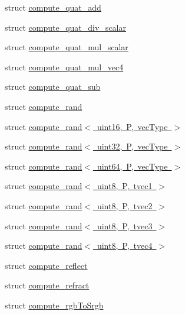 \begin{DoxyCompactItemize}
struct \mbox{\hyperlink{structglm_1_1detail_1_1compute__quat__add}{compute\+\_\+quat\+\_\+add}}
\item 
struct \mbox{\hyperlink{structglm_1_1detail_1_1compute__quat__div__scalar}{compute\+\_\+quat\+\_\+div\+\_\+scalar}}
\item 
struct \mbox{\hyperlink{structglm_1_1detail_1_1compute__quat__mul__scalar}{compute\+\_\+quat\+\_\+mul\+\_\+scalar}}
\item 
struct \mbox{\hyperlink{structglm_1_1detail_1_1compute__quat__mul__vec4}{compute\+\_\+quat\+\_\+mul\+\_\+vec4}}
\item 
struct \mbox{\hyperlink{structglm_1_1detail_1_1compute__quat__sub}{compute\+\_\+quat\+\_\+sub}}
\item 
struct \mbox{\hyperlink{structglm_1_1detail_1_1compute__rand}{compute\+\_\+rand}}
\item 
struct \mbox{\hyperlink{structglm_1_1detail_1_1compute__rand_3_01uint16_00_01_p_00_01vec_type_01_4}{compute\+\_\+rand$<$ uint16, P, vec\+Type $>$}}
\item 
struct \mbox{\hyperlink{structglm_1_1detail_1_1compute__rand_3_01uint32_00_01_p_00_01vec_type_01_4}{compute\+\_\+rand$<$ uint32, P, vec\+Type $>$}}
\item 
struct \mbox{\hyperlink{structglm_1_1detail_1_1compute__rand_3_01uint64_00_01_p_00_01vec_type_01_4}{compute\+\_\+rand$<$ uint64, P, vec\+Type $>$}}
\item 
struct \mbox{\hyperlink{structglm_1_1detail_1_1compute__rand_3_01uint8_00_01_p_00_01tvec1_01_4}{compute\+\_\+rand$<$ uint8, P, tvec1 $>$}}
\item 
struct \mbox{\hyperlink{structglm_1_1detail_1_1compute__rand_3_01uint8_00_01_p_00_01tvec2_01_4}{compute\+\_\+rand$<$ uint8, P, tvec2 $>$}}
\item 
struct \mbox{\hyperlink{structglm_1_1detail_1_1compute__rand_3_01uint8_00_01_p_00_01tvec3_01_4}{compute\+\_\+rand$<$ uint8, P, tvec3 $>$}}
\item 
struct \mbox{\hyperlink{structglm_1_1detail_1_1compute__rand_3_01uint8_00_01_p_00_01tvec4_01_4}{compute\+\_\+rand$<$ uint8, P, tvec4 $>$}}
\item 
struct \mbox{\hyperlink{structglm_1_1detail_1_1compute__reflect}{compute\+\_\+reflect}}
\item 
struct \mbox{\hyperlink{structglm_1_1detail_1_1compute__refract}{compute\+\_\+refract}}
\item 
struct \mbox{\hyperlink{structglm_1_1detail_1_1compute__rgb_to_srgb}{compute\+\_\+rgb\+To\+Srgb}}
\item 

\end{DoxyCompactItemize}
